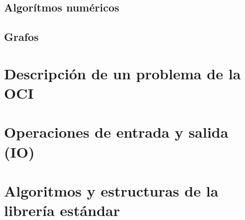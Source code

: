 \documentclass{article}
\begin{document}
\subsection{Algorítmos numéricos}


\subsection{Grafos}


\newpage
\appendix
\section{Descripción de un problema de la OCI}
\label{problem-description}


\section{Operaciones de entrada y salida (IO)}
\label{tech-IO}


\section{Algoritmos y estructuras de la librería estándar}

\end{document}
